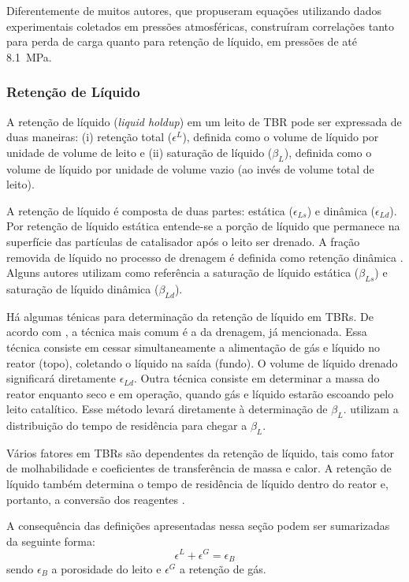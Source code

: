 Diferentemente de muitos autores, que propuseram equações utilizando dados
experimentais coletados em pressões atmosféricas, 
construíram correlações tanto para perda de carga quanto para retenção de
líquido, em pressões de até \SI{8,1}{MPa}.

\subsubsection{Retenção de Líquido}
\label{sec:retencaodeliquido}

A retenção de líquido (\emph{liquid holdup}) em um leito de TBR  pode ser
expressada de duas maneiras: (i) retenção total ($\epsilon^L$), definida como o
volume de líquido por unidade de volume de leito e (ii) saturação de líquido
($\beta_L$), definida como o volume de líquido por unidade de volume vazio (ao
invés de volume total de leito).

A retenção de líquido é composta de duas partes: estática ($\epsilon_{Ls}$) e
dinâmica ($\epsilon_{Ld}$). Por retenção de líquido estática entende-se a
porção de líquido que permanece na superfície das partículas de catalisador após o
leito ser drenado. A fração removida de líquido no processo de drenagem é
definida como retenção dinâmica \cite{Ranade2011}. Alguns autores utilizam como
referência a saturação de líquido estática ($\beta_{Ls}$) e saturação de líquido
dinâmica ($\beta_{Ld}$).

Há algumas ténicas para determinação da retenção de líquido em TBRs. De acordo
com , a técnica mais comum é a da drenagem, já
mencionada. Essa técnica consiste em cessar simultaneamente a alimentação de gás
e líquido no reator (topo), coletando o líquido na saída (fundo). O volume de
líquido drenado significará diretamente $\epsilon_{Ld}$. Outra técnica consiste
em determinar a massa do reator enquanto seco e em operação, quando gás e
líquido estarão escoando pelo leito catalítico. Esse método levará diretamente à
determinação de $\beta_L$.  utilizam a distribuição do
tempo de residência para chegar a $\beta_L$.

Vários fatores em TBRs são dependentes da retenção de líquido, tais como fator
de molhabilidade e coeficientes de transferência de massa e calor. A retenção de
líquido também determina o tempo de residência de líquido dentro do reator e,
portanto, a conversão dos reagentes \cite{Ranade2011}.

A consequência das definições apresentadas nessa seção podem ser sumarizadas
da seguinte forma:
\begin{equation}
\epsilon^L + \epsilon^G = \epsilon_B
\label{eq:balancoespaco1}
\end{equation}
sendo $\epsilon_B$ a porosidade do leito e $\epsilon^G$ a retenção de gás.

